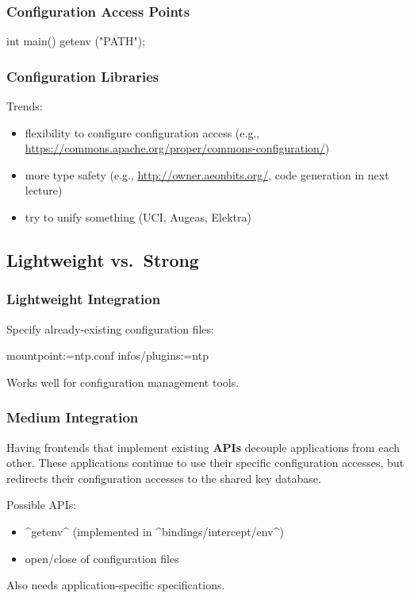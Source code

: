\begin{frame}[fragile]
	\frametitle{Configuration Access Points}

	\begin{code}[language=Cpp,gobble=4,showspaces=no]
	int main()
	{
		getenv ("PATH");
	}
	\end{code}
\end{frame}

\begin{frame}[fragile]
	\frametitle{Configuration Libraries}

	Trends:
	\begin{itemize}[<+-| alert@+>]
	\item flexibility to configure configuration access (e.g., \url{https://commons.apache.org/proper/commons-configuration/})
	\item more type safety (e.g., \url{http://owner.aeonbits.org/}, code generation in next lecture)
	\item try to unify something (UCI, Augeas, Elektra)
	\end{itemize}
\end{frame}

\subsection{Lightweight vs.\ Strong}

\begin{frame}[fragile]
	\frametitle{Lightweight Integration}

	Specify already-existing configuration files:
	\begin{code}[language=Cpp,gobble=4,showspaces=no]
	[ntp]
	  mountpoint:=ntp.conf
	  infos/plugins:=ntp
	\end{code}
	Works well for configuration management tools.
\end{frame}

\begin{frame}[fragile]
	\frametitle{Medium Integration}

	Having frontends that implement existing \textbf{APIs} decouple applications from each other.
	These applications continue to use their specific configuration accesses, but \elektra{} redirects their configuration accesses to the shared key database.

	Possible APIs:
	\begin{itemize}[<+-| alert@+>]
	\item ^getenv^ (implemented in ^bindings/intercept/env^)
	\item open/close of configuration files
	\end{itemize}

	\pause[\thebeamerpauses]

	Also needs application-specific specifications.
\end{frame}

